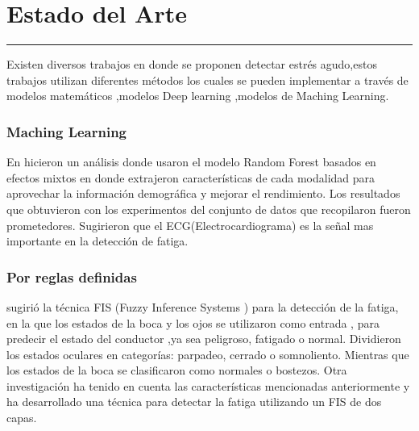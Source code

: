 \chapter{Estado del Arte }

\hrule \bigskip \vspace*{1cm}


Existen diversos trabajos en donde se proponen detectar  estrés agudo,estos trabajos utilizan diferentes métodos los cuales se pueden implementar a través de modelos matemáticos ,modelos Deep learning ,modelos de Maching Learning.

\subsection{ Maching Learning
} En  \cite{bai2021towards} hicieron un análisis donde usaron  el modelo  Random Forest basados en  efectos mixtos  en donde 
extrajeron características de cada modalidad  para aprovechar la información demográfica y  mejorar el rendimiento. Los resultados que obtuvieron con los experimentos del   conjunto de datos que recopilaron fueron prometedores. Sugirieron que el ECG(Electrocardiograma) es la señal mas importante en la detección de fatiga.









\subsection {Por reglas definidas }

\cite{devi2010fuzzy} sugirió la  técnica FIS (Fuzzy Inference Systems ) para la detección de la fatiga, en la que los estados de la boca y los ojos se utilizaron como entrada , para predecir  el estado del conductor ,ya sea  peligroso, fatigado o normal. Dividieron los estados oculares en categorías: parpadeo, cerrado o somnoliento. Mientras que los estados de la boca se clasificaron como normales o bostezos. Otra investigación\cite{sikander2018driver} ha tenido en cuenta las características mencionadas anteriormente y ha desarrollado una técnica para detectar la fatiga utilizando un FIS de dos capas.

